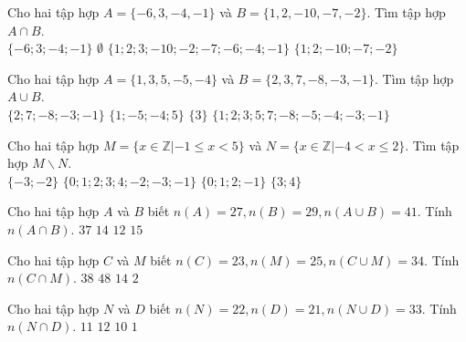 


\begin{ex}
 Cho hai tập hợp $A=\{{-6, 3, -4, -1}\}$ và $B=\{{1, 2, -10, -7, -2}\}$. Tìm tập hợp $A\cap B$. \\ 
\choice
{ $\{{-6; 3; -4; -1}\}$ }
   { \True $\emptyset$ }
     { $\{{1; 2; 3; -10; -2; -7; -6; -4; -1}\}$ }
    { $\{{1; 2; -10; -7; -2}\}$ }
\loigiai{ 
  
 }\end{ex}

\begin{ex}
 Cho hai tập hợp $A=\{{1, 3, 5, -5, -4}\}$ và $B=\{{2, 3, 7, -8, -3, -1}\}$. Tìm tập hợp $A\cup B$. \\ 
\choice
{ $\{{2; 7; -8; -3; -1}\}$ }
   { $\{{1; -5; -4; 5}\}$ }
     { $\{{3}\}$ }
    { \True $\{{1; 2; 3; 5; 7; -8; -5; -4; -3; -1}\}$ }
\loigiai{ 
  
 }\end{ex}

\begin{ex}
 Cho hai tập hợp $M=\{x\in \mathbb{Z}|-1 \le x < 5\}$ và $N=\{x\in \mathbb{Z}|-4 < x \le 2\}$. Tìm tập hợp $M \backslash N$.\\ 
\choice
{ $\{{-3; -2}\}$ }
   { $\{{0; 1; 2; 3; 4; -2; -3; -1}\}$ }
     { $\{{0; 1; 2; -1}\}$ }
    { \True $\{{3; 4}\}$ }
\end{ex}

\begin{ex}
 Cho hai tập hợp ${A}$ và ${B}$ biết $n(A)=27,n(B)=29, n(A\cup B)=41$. Tính $n(A\cap B)$. 
\choice
{ ${37}$ }
   { ${14}$ }
     { ${12}$ }
    { \True ${15}$ }
\end{ex}

\begin{ex}
 Cho hai tập hợp ${C}$ và ${M}$ biết $n(C)=23,n(M)=25, n(C\cup M)=34$. Tính $n(C\cap M)$. 
\choice
{ ${38}$ }
   { ${48}$ }
     { \True ${14}$ }
    { ${2}$ }
\end{ex}

\begin{ex}
 Cho hai tập hợp ${N}$ và ${D}$ biết $n(N)=22,n(D)=21, n(N\cup D)=33$. Tính $n(N\cap D)$. 
\choice
{ ${11}$ }
   { ${12}$ }
     { \True ${10}$ }
    { ${1}$ }
\end{ex}

